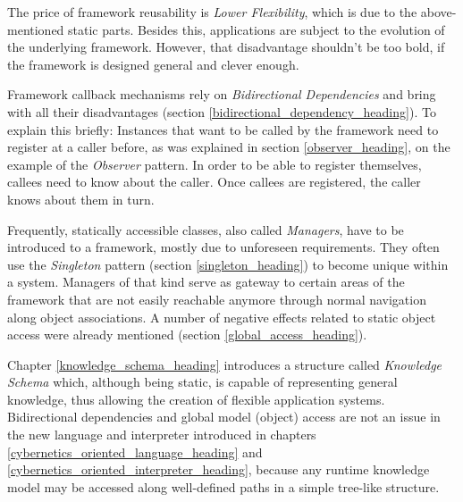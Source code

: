 The price of framework reusability is \emph{Lower Flexibility}, which is due to
the above-mentioned static parts. Besides this, applications are subject to the
evolution of the underlying framework. However, that disadvantage shouldn't be
too bold, if the framework is designed general and clever enough.

Framework callback mechanisms rely on \emph{Bidirectional Dependencies} and bring
with all their disadvantages (section \ref{bidirectional_dependency_heading}). To
explain this briefly: Instances that want to be called by the framework need to
register at a caller before, as was explained in section \ref{observer_heading},
on the example of the \emph{Observer} pattern. In order to be able to register
themselves, callees need to know about the caller. Once callees are registered,
the caller knows about them in turn.

Frequently, statically accessible classes, also called \emph{Managers}, have to
be introduced to a framework, mostly due to unforeseen requirements. They often
use the \emph{Singleton} pattern (section \ref{singleton_heading}) to become
unique within a system. Managers of that kind serve as gateway to certain areas
of the framework that are not easily reachable anymore through normal navigation
along object associations. A number of negative effects related to static object
access were already mentioned (section \ref{global_access_heading}).

Chapter \ref{knowledge_schema_heading} introduces a structure called
\emph{Knowledge Schema} which, although being static, is capable of
representing general knowledge, thus allowing the creation of flexible
application systems. Bidirectional dependencies and global model (object)
access are not an issue in the new language and interpreter introduced in
chapters \ref{cybernetics_oriented_language_heading} and
\ref{cybernetics_oriented_interpreter_heading}, because any runtime knowledge
model may be accessed along well-defined paths in a simple tree-like structure.
